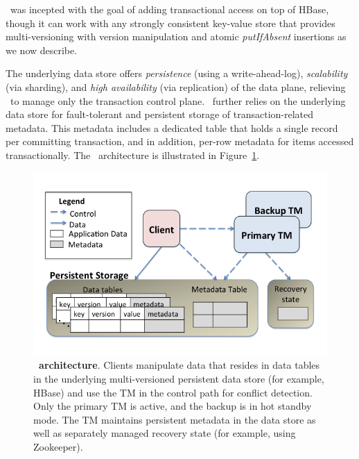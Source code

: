 
\sys\ was incepted with the  goal of adding transactional access on top of HBase,
though it can work with any strongly consistent key-value store that provides multi-versioning with version 
manipulation and atomic \emph{putIfAbsent} insertions as we now describe.

The underlying data store offers \emph{persistence} (using a write-ahead-log), \emph{scalability} (via sharding),  and \emph{high availability} (via replication) of the data plane, relieving \sys\ to manage only the transaction control plane.
\sys\ further relies on the underlying data store 
for fault-tolerant and persistent storage of transaction-related metadata.
This metadata includes a dedicated table that holds a single record per committing transaction, and 
in addition, per-row metadata for items accessed transactionally.
The \sys\ architecture is illustrated in Figure~\ref{fig:Omid_Architecture}.

\begin{figure}[t]
\centerline{
\includegraphics[width = 0.95\columnwidth]{OmidComponents.png}
}
\caption{{\bf \sys\ architecture}. Clients manipulate data that resides in data tables in the underlying multi-versioned persistent data store (for example, HBase) and use the TM in the control path for conflict detection. Only the primary TM is active, and the backup is in hot standby mode. The TM maintains persistent metadata in the data store as well as separately managed recovery state (for example, using Zookeeper).}
\label{fig:Omid_Architecture}
\end{figure}


